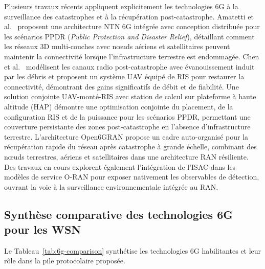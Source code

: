 Plusieurs travaux récents appliquent explicitement les technologies 6G à la surveillance des catastrophes et à la récupération post-catastrophe. Amatetti et al.\ \cite{amatetti2024ntn} proposent une architecture NTN 6G intégrée avec conception distribuée pour les scénarios PPDR (\emph{Public Protection and Disaster Relief}), détaillant comment les réseaux 3D multi-couches avec n\oe{}uds aériens et satellitaires peuvent maintenir la connectivité lorsque l'infrastructure terrestre est endommagée. Chen et al.\ \cite{chen2024ris_uav} modélisent les canaux radio post-catastrophe avec évanouissement induit par les débris et proposent un système UAV équipé de RIS pour restaurer la connectivité, démontrant des gains significatifs de débit et de fiabilité. Une solution conjointe UAV-monté-RIS avec station de calcul sur plateforme à haute altitude (HAP) \cite{uav_hap_ris_ppdr2025} démontre une optimisation conjointe du placement, de la configuration RIS et de la puissance pour les scénarios PPDR, permettant une couverture persistante des zones post-catastrophe en l'absence d'infrastructure terrestre. L'architecture Open6GRAN \cite{open6gran2024} propose un cadre auto-organisé pour la récupération rapide du réseau après catastrophe à grande échelle, combinant des nœuds terrestres, aériens et satellitaires dans une architecture RAN résiliente. Des travaux en cours explorent également l'intégration de l'ISAC dans les modèles de service O-RAN pour exposer nativement les observables de détection, ouvrant la voie à la surveillance environnementale intégrée au RAN.

\subsection{Synthèse comparative des technologies 6G pour les WSN}

Le Tableau~\ref{tab:6g-comparison} synthétise les technologies 6G habilitantes et leur rôle dans la pile protocolaire proposée.

